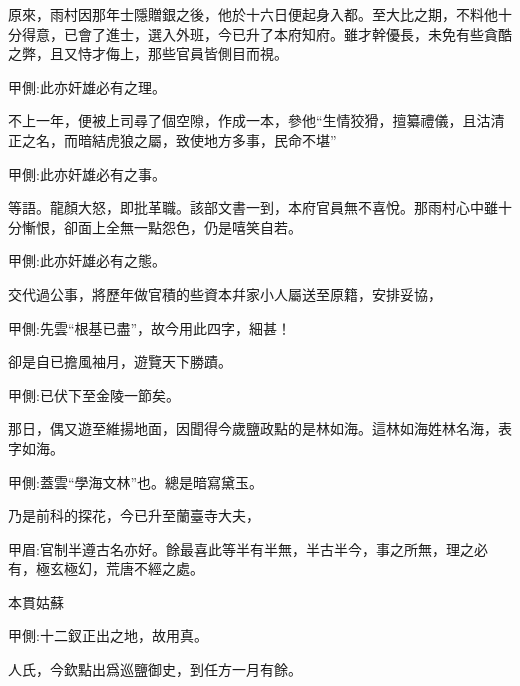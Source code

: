 \begin{parag}
    原來，雨村因那年士隱贈銀之後，他於十六日便起身入都。至大比之期，不料他十分得意，已會了進士，選入外班，今已升了本府知府。雖才幹優長，未免有些貪酷之弊，且又恃才侮上，那些官員皆側目而視。\begin{note}甲側:此亦奸雄必有之理。\end{note}不上一年，便被上司尋了個空隙，作成一本，參他“生情狡猾，擅纂禮儀，且沽清正之名，而暗結虎狼之屬，致使地方多事，民命不堪”\begin{note}甲側:此亦奸雄必有之事。\end{note}等語。龍顏大怒，即批革職。該部文書一到，本府官員無不喜悅。那雨村心中雖十分慚恨，卻面上全無一點怨色，仍是嘻笑自若。\begin{note}甲側:此亦奸雄必有之態。\end{note}交代過公事，將歷年做官積的些資本幷家小人屬送至原籍，安排妥協，\begin{note}甲側:先雲“根基已盡”，故今用此四字，細甚！\end{note}卻是自已擔風袖月，遊覽天下勝蹟。\begin{note}甲側:已伏下至金陵一節矣。\end{note}
\end{parag}


\begin{parag}
    那日，偶又遊至維揚地面，因聞得今歲鹽政點的是林如海。這林如海姓林名海，表字如海。\begin{note}甲側:蓋雲“學海文林”也。總是暗寫黛玉。\end{note}乃是前科的探花，今已升至蘭臺寺大夫，\begin{note}甲眉:官制半遵古名亦好。餘最喜此等半有半無，半古半今，事之所無，理之必有，極玄極幻，荒唐不經之處。\end{note}本貫姑蘇\begin{note}甲側:十二釵正出之地，故用真。\end{note}人氏，今欽點出爲巡鹽御史，到任方一月有餘。
\end{parag}


